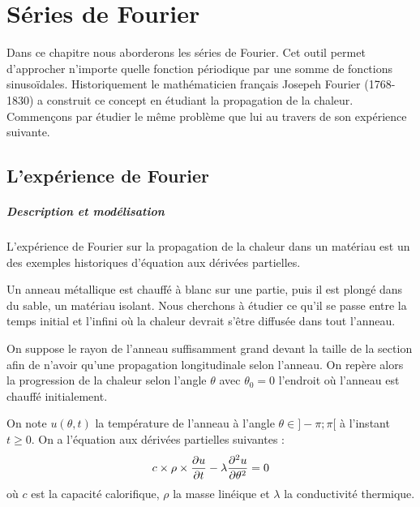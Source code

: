\chapter{Séries de Fourier}
\label{ch-6}


	Dans ce chapitre nous aborderons les séries de Fourier. Cet outil permet d'approcher n'importe quelle fonction périodique par une somme de fonctions sinusoïdales. Historiquement le mathématicien français Josepeh Fourier (1768-1830) a construit ce concept en étudiant la propagation de la chaleur. Commençons par étudier le même problème que lui au travers de son expérience suivante.


\section{L'expérience de Fourier}

	\paragraph{Description et modélisation}
		L'expérience de Fourier sur la propagation de la chaleur dans un matériau est un des exemples historiques d'équation aux dérivées partielles.
		\smallskip

		Un anneau métallique est chauffé à blanc sur une partie, puis il est plongé dans du sable, un matériau isolant. Nous cherchons à étudier ce qu'il se passe entre la temps initial et l'infini où la chaleur devrait s'être diffusée dans tout l'anneau.

		On suppose le rayon de l'anneau suffisamment grand devant la taille de la section afin de n'avoir qu'une propagation longitudinale selon l'anneau. On repère alors la progression de la chaleur selon l'angle $\theta$ avec $\theta_0 = 0$ l'endroit où l'anneau est chauffé initialement.

		On note $u(\theta,t)$ la température de l'anneau à l'angle $\theta\in]-\pi;\pi[$ à l'instant $t\geq0$. On a l'équation aux dérivées partielles suivantes :
			$$
			c \times \rho \times \frac{\partial u}{\partial t} - \lambda \frac{\partial^{2} u}{\partial \theta^{2}} = 0
			$$
		où $c$ est la capacité calorifique, $\rho$ la masse linéique et $\lambda$ la conductivité thermique.

